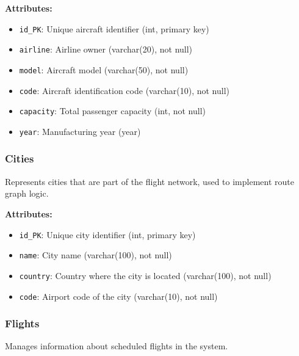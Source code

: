 \documentclass[conference]{IEEEtran}
\begin{document}
    \textbf{Attributes:}
    \begin{itemize}
        \item \texttt{id\_PK}: Unique aircraft identifier (int, primary key)
        \item \texttt{airline}: Airline owner (varchar(20), not null)
        \item \texttt{model}: Aircraft model (varchar(50), not null)
        \item \texttt{code}: Aircraft identification code (varchar(10), not null)
        \item \texttt{capacity}: Total passenger capacity (int, not null)
        \item \texttt{year}: Manufacturing year (year)
    \end{itemize}

    \subsubsection{Cities}
    Represents cities that are part of the flight network, used to implement route graph logic.

    \textbf{Attributes:}
    \begin{itemize}
        \item \texttt{id\_PK}: Unique city identifier (int, primary key)
        \item \texttt{name}: City name (varchar(100), not null)
        \item \texttt{country}: Country where the city is located (varchar(100), not null)
        \item \texttt{code}: Airport code of the city (varchar(10), not null)
    \end{itemize}

    \subsubsection{Flights}
    Manages information about scheduled flights in the system.
\end{document}

